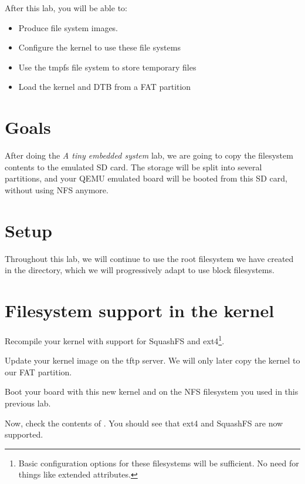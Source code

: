 
After this lab, you will be able to:
\begin{itemize}
\item Produce file system images.
\item Configure the kernel to use these file systems
\item Use the tmpfs file system to store temporary files
\item Load the kernel and DTB from a FAT partition
\end{itemize}

\section{Goals}

After doing the {\em A tiny embedded system} lab, we are going to copy
the filesystem contents to the emulated SD card. The storage will be
split into several partitions, and your QEMU emulated board will
be booted from this SD card, without using NFS anymore.

\section{Setup}

Throughout this lab, we will continue to use the root filesystem we
have created in the 
directory, which we will progressively adapt to use block filesystems.

\section{Filesystem support in the kernel}

Recompile your kernel with support for SquashFS and ext4\footnote{Basic
configuration options for these filesystems will be sufficient. No need
for things like extended attributes.}.

Update your kernel image on the tftp server. We will only later copy
the kernel to our FAT partition.

Boot your board with this new kernel and on the NFS filesystem you
used in this previous lab.

Now, check the contents of . You should see
 that ext4 and SquashFS are now supported.

